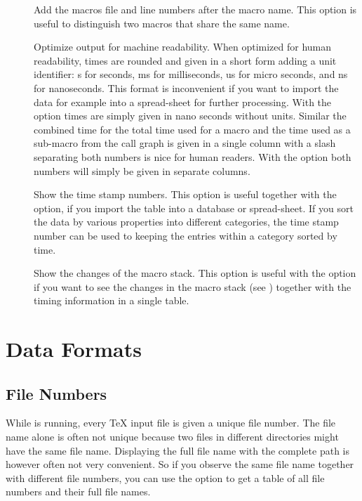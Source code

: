 \documentclass[a4paper,english]{article}
\begin{document}
\begin{description}
\item[]
  Add the macros file and line numbers after the macro name.
  This option is useful to distinguish two macros that share
  the same name.
\item[]
  Optimize output for machine readability. When optimized for human readability,
  times are rounded and given in a short form adding a unit identifier:
  s for seconds, ms for milliseconds, us for micro seconds, and ns for
  nanoseconds. This format is inconvenient if you want to import the data
  for example into a spread-sheet for further processing.
  With the  option times are simply given in nano seconds without units.
  Similar the combined time for the total time used for a macro and the
  time used as a sub-macro from the call graph is given in a single column
  with a slash separating both numbers is nice for human readers.
  With the  option both numbers will simply be given in separate columns.
  
\item[]
  Show the time stamp numbers. This option is useful together with
  the  option, if you import the table into a database or spread-sheet.
  If you sort the data by various properties into different
  categories, the time stamp number can be used to keeping the entries
   within a category sorted by time.
  
\item[]
  Show the changes of the macro stack.
  This option is useful with the  option if you want to see the changes
  in the macro stack (see ) together with the timing information in
  a single table.
\end{description}


\section{Data Formats}
\subsection{File Numbers}
While  is running, every TeX input file is given a
unique file number. The file name alone is often not unique because
two files in different directories might have the same file
name. Displaying the full file name with the complete path is however often
not very
convenient. So if you observe the same file name together with
different file numbers, you can use the option  to get a table of all
file numbers and their full file names.
\end{document}
